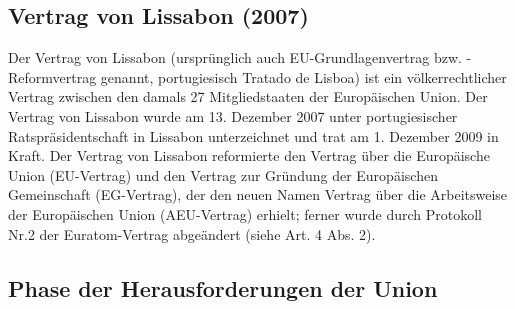 \subsection{Vertrag von Lissabon (2007)}\label{subsec:lissabon}

Der Vertrag von Lissabon (ursprünglich auch EU-Grundlagenvertrag bzw. -Reformvertrag genannt, portugiesisch Tratado de Lisboa) ist ein völkerrechtlicher Vertrag zwischen den damals 27 Mitgliedstaaten der Europäischen Union.\newline
Der Vertrag von Lissabon wurde am 13. Dezember 2007 unter portugiesischer Ratspräsidentschaft in Lissabon unterzeichnet und trat am 1. Dezember 2009 in Kraft.\newline
Der Vertrag von Lissabon reformierte den Vertrag über die Europäische Union (EU-Vertrag) und den Vertrag zur Gründung der Europäischen Gemeinschaft (EG-Vertrag), der den neuen Namen Vertrag über die Arbeitsweise der Europäischen Union (AEU-Vertrag) erhielt; ferner wurde durch Protokoll Nr.2 der Euratom-Vertrag abgeändert (siehe Art. 4 Abs. 2). 

\subsection{Phase der Herausforderungen der Union}\label{subsec:phaseHeraus}

